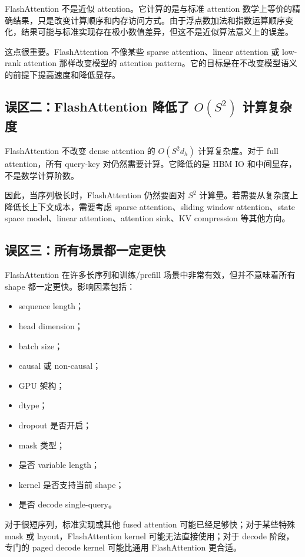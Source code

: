 FlashAttention 不是近似 attention。它计算的是与标准 attention 数学上等价的精确结果，只是改变计算顺序和内存访问方式。由于浮点数加法和指数运算顺序变化，结果可能与标准实现存在极小数值差异，但这不是近似算法意义上的误差。

这点很重要。FlashAttention 不像某些 sparse attention、linear attention 或 low-rank attention 那样改变模型的 attention pattern。它的目标是在不改变模型语义的前提下提高速度和降低显存。

\subsection{误区二：FlashAttention 降低了 $O(S^2)$ 计算复杂度}
\label{subsec:misconception-flashattention-compute-complexity}

FlashAttention 不改变 dense attention 的 $O(S^2d_h)$ 计算复杂度。对于 full attention，所有 query-key 对仍然需要计算。它降低的是 HBM IO 和中间显存，不是数学计算阶数。

因此，当序列极长时，FlashAttention 仍然要面对 $S^2$ 计算量。若需要从复杂度上降低长上下文成本，需要考虑 sparse attention、sliding window attention、state space model、linear attention、attention sink、KV compression 等其他方向。

\subsection{误区三：所有场景都一定更快}
\label{subsec:misconception-flashattention-always-faster}

FlashAttention 在许多长序列和训练/prefill 场景中非常有效，但并不意味着所有 shape 都一定更快。影响因素包括：

\begin{itemize}
\item sequence length；
\item head dimension；
\item batch size；
\item causal 或 non-causal；
\item GPU 架构；
\item dtype；
\item dropout 是否开启；
\item mask 类型；
\item 是否 variable length；
\item kernel 是否支持当前 shape；
\item 是否 decode single-query。
\end{itemize}

对于很短序列，标准实现或其他 fused attention 可能已经足够快；对于某些特殊 mask 或 layout，FlashAttention kernel 可能无法直接使用；对于 decode 阶段，专门的 paged decode kernel 可能比通用 FlashAttention 更合适。

